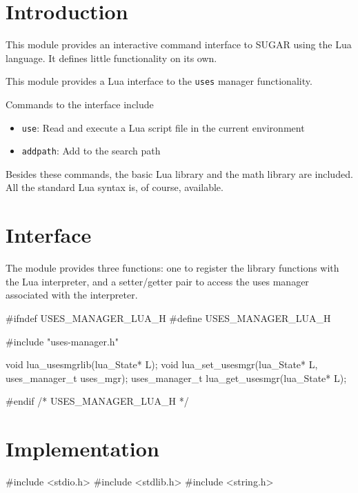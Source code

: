 \section{Introduction}

This module provides an interactive command interface to SUGAR
using the Lua language.  It defines little functionality on its
own.

This module provides a Lua interface to the {\tt{}uses} manager
functionality.

Commands to the interface include
\begin{itemize}
  \item {\tt{}use}:
    Read and execute a Lua script file in the current environment
  \item {\tt{}addpath}: Add to the search path
\end{itemize}

Besides these commands, the basic Lua library and the math library
are included.  All the standard Lua syntax is, of course, available.


\section{Interface}

The module provides three functions: one to register the library
functions with the Lua interpreter, and a setter/getter pair to
access the uses manager associated with the interpreter.

\endmoddef
#ifndef USES_MANAGER_LUA_H
#define USES_MANAGER_LUA_H

#include "uses-manager.h"

void lua_usesmgrlib(lua_State* L);
void lua_set_usesmgr(lua_State* L, uses_manager_t uses_mgr);
uses_manager_t lua_get_usesmgr(lua_State* L);

#endif /* USES_MANAGER_LUA_H */
\nwendcode{}\nwdocspar


\section{Implementation}

\nwenddocs{}\endmoddef
#include <stdio.h>
#include <stdlib.h>
#include <string.h>

